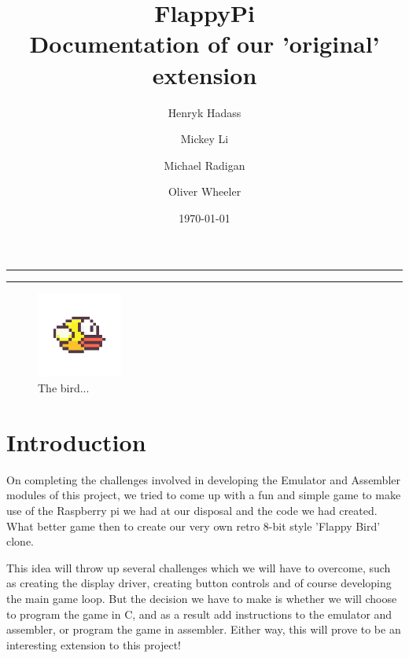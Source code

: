 \documentclass[11pt]{article}
\begin{document}
\title{
	{\huge\textbf{FlappyPi}} \\		
	Documentation of our 'original' extension
	}

\author{Henryk Hadass \and Mickey Li \and Michael Radigan \and Oliver Wheeler}
\date{\today}
\maketitle

\noindent
\rule{8cm}{0.6pt}

\tableofcontents

\noindent
\rule{8cm}{0.6pt}
\begin{figure}
  \vspace{-10pt}
  \begin{center}
    \includegraphics[width=0.25\textwidth]{flappyBird.png}
  \end{center}
  \vspace{-30pt}
  \caption{The bird...}
  \vspace{-20pt}
\end{figure}
\section{Introduction}
On completing the challenges involved in developing the Emulator and Assembler modules of this project, we tried to come up with a fun and simple game to make use of the Raspberry pi we had at our disposal and the code we had created. What better game then to create our very own retro 8-bit style 'Flappy Bird' clone.

This idea will throw up several challenges which we will have to overcome, such as creating the display driver, creating button controls and of course developing the main game loop. But the decision we have to make is whether we will choose to program the game in C, and as a result add instructions to the emulator and assembler, or program the game in assembler. Either way, this will prove to be an interesting extension to this project!



\pagebreak
\end{document}
